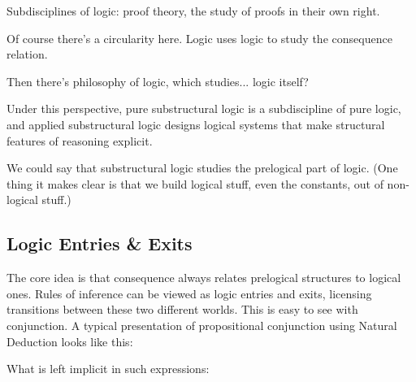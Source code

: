 \documentclass{article}
\begin{document}
Subdisciplines of logic: proof theory, the study of proofs in their
own right.

Of course there's a circularity here. Logic uses logic to study the
consequence relation.

Then there's philosophy of logic, which studies... logic itself?

Under this perspective, pure substructural logic is a subdiscipline of
pure logic, and applied substructural logic designs logical systems
that make structural features of reasoning explicit.

We could say that substructural logic studies the prelogical part of
logic. (One thing it makes clear is that we build logical stuff, even
the constants, out of non-logical stuff.)

\subsection{Logic Entries \& Exits}

The core idea is that consequence always relates prelogical structures
to logical ones. Rules of inference can be viewed as logic entries and
exits, licensing transitions between these two different worlds. This
is easy to see with conjunction. A typical presentation of
propositional conjunction using Natural Deduction looks like this:


What is left implicit in such expressions:
\end{document}
